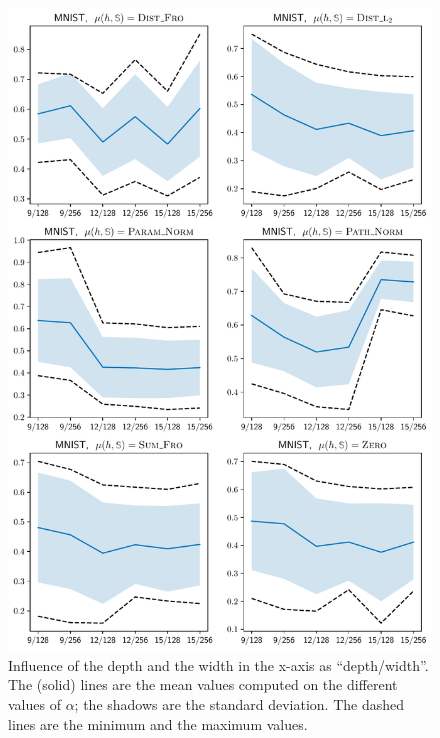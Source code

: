 \begin{noaddcontents}
\begin{figure}
    \centering
    \includegraphics[width=0.77\linewidth]{chapter_7/figures/influence_depth_mnist.pdf}
    \caption{
    Influence of the depth and the width in the x-axis as ``depth/width''.
    The (solid) lines are the mean values computed on the different values of $\alpha$; the shadows are the standard deviation. 
    The dashed lines are the minimum and the maximum values.
    }
    \label{ap:dis-mu:fig:influence-depth-1}
\end{figure}


\end{noaddcontents}
